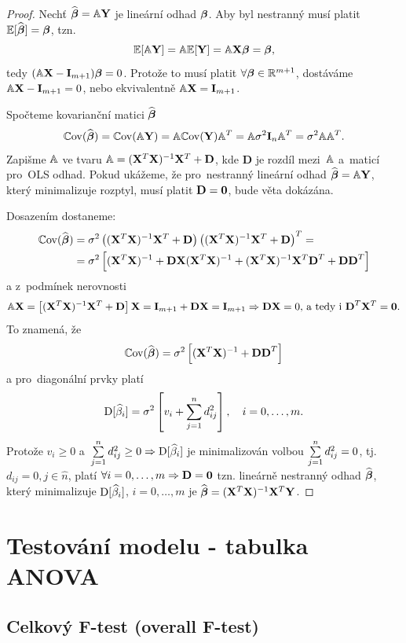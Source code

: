 \begin{proof}
	Nechť $\widehat{\boldsymbol{\beta}} = \mathbb{A} \mathbf{Y}$ je lineární odhad $\boldsymbol{\beta}$. Aby byl nestranný musí platit $\mathbb{E} [\widehat{\boldsymbol{\beta}}] = \boldsymbol{\beta}$, tzn. $$ \mathbb{E} [\mathbb{A} \mathbf{Y}] = \mathbb{A} \mathbb{E} [\mathbf{Y}] = \mathbb{A} \mathbf{X} \boldsymbol{\beta} = \boldsymbol{\beta}, $$
	tedy $(\mathbb{A} \mathbf{X} - \textbf{I}_{m+1}) \boldsymbol{\beta} = 0$. Protože to musí platit $\forall \boldsymbol{\beta} \in \mathbb{R}^{m+1}$, dostáváme $\mathbb{A} \mathbf{X} - \textbf{I}_{m+1} = 0$, nebo ekvivalentně $\mathbb{A} \mathbf{X} = \textbf{I}_{m+1}$.
	
	Spočteme kovarianční matici $\widehat{\boldsymbol{\beta}}$
 $$
	\mathbb{C}\mathrm{ov}(\widehat{\boldsymbol{\beta}}) = \mathbb{C}\mathrm{ov}(\mathbb{A} \mathbf{Y}) = \mathbb{A} \mathbb{C}\mathrm{ov}(\mathbf{Y}) \mathbb{A}^T = \mathbb{A} \sigma^2 \mathbf{I}_n  \mathbb{A}^T = \sigma^2 \mathbb{A} \mathbb{A}^T.
 $$
Zapišme $\mathbb{A}$ ve tvaru $\mathbb{A} = (\mathbf{X}^T \mathbf{X})^{-1} \mathbf{X}^T + \textbf{D}$, kde \textbf{D} je rozdíl mezi~$\mathbb{A}$ a~maticí pro~OLS odhad.
Pokud ukážeme, že pro~nestranný lineární odhad $\widehat{\boldsymbol{\beta}} = \mathbb{A} \mathbf{Y}$, který minimalizuje rozptyl, musí platit $\textbf{D} = \boldsymbol{0}$, bude věta dokázána.

Dosazením dostaneme:
\begin{align*}
	\mathbb{C}\mathrm{ov}(\widehat{\boldsymbol{\beta}}) & = \sigma^2 \left((\mathbf{X}^T \mathbf{X})^{-1} \mathbf{X}^T + \textbf{D}\right) \left((\mathbf{X}^T \mathbf{X})^{-1} \mathbf{X}^T + \textbf{D}\right)^T = \\
& = \sigma^2 \left[(\mathbf{X}^T \mathbf{X})^{-1} + \textbf{D} \mathbf{X} (\mathbf{X}^T \mathbf{X})^{-1} + (\mathbf{X}^T \mathbf{X})^{-1} \mathbf{X}^T \textbf{D}^T + \textbf{DD}^T \right]
\end{align*}
a z~podmínek nerovnosti
 $$
\mathbb{A} \mathbf{X} = \left[(\mathbf{X}^T \mathbf{X})^{-1} \mathbf{X}^T + \textbf{D}\right] \mathbf{X} = \textbf{I}_{m+1} + \textbf{D} \mathbf{X} = \textbf{I}_{m+1}  \Rightarrow  \textbf{D} \mathbf{X} = 0 \text{, a~tedy i~} \textbf{D}^T \mathbf{X}^T = \boldsymbol{0}.
 $$
To znamená, že
 $$
\mathbb{C}\mathrm{ov}(\widehat{\boldsymbol{\beta}}) = \sigma^2 \left[(\mathbf{X}^T \mathbf{X})^{-1} + \textbf{DD}^T\right]
 $$
a pro~diagonální prvky platí
 $$
\mathrm{D} [\widehat{\beta}_i] = \sigma^2 \left[v_i + \sum\limits_{j=1}^{n} d_{ij}^2\right], \quad i = 0,\dots, m.
 $$
Protože $v_i \geq 0$ a~$\sum\limits_{j=1}^{n} d_{ij}^2 \geq 0 \Rightarrow \mathrm{D} [\widehat{\beta}_i]$ je minimalizován volbou $\sum\limits_{j=1}^{n} d_{ij}^2 = 0$, tj. $d_{ij} = 0, j\in\widehat{n}$, platí $\forall i = 0,\dots, m \Rightarrow \textbf{D} = \boldsymbol{0}$ tzn. lineárně nestranný odhad $\widehat{\boldsymbol{\beta}}$, který minimalizuje $\mathrm{D} [\widehat{\beta}_i]$, $i = 0,\dots, m$ je $\widehat{\boldsymbol{\beta}} = (\mathbf{X}^T \mathbf{X})^{-1} \mathbf{X}^T \mathbf{Y}$.
\end{proof}
\section{Testování modelu - tabulka ANOVA}
\subsection{Celkový F-test (overall F-test)}

